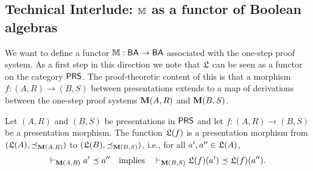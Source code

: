 \documentclass{book}
\begin{document}
\subsection{Technical Interlude: $\mathbb{M}$ as a functor of Boolean algebras}
\label{sec:M-functor}

We want to define a functor $\mathbb{M}: \mathsf{BA} \to \mathsf{BA}$ associated with the
one-step proof system.  As a first step in this direction we note that
$\mathfrak{L}$ can be seen as a functor on the category $\mathsf{PRS}$.  The
proof-theoretic content of this is that a morphism $f:(A,R) \to (B,S)$
between presentations extends to a map of derivations between the
one-step proof systems $\mathbf{M}(A,R)$ and $\mathbf{M}(B,S)$.

\begin{proposition}
\label{prop:liftfun}
Let $(A,R)$ and $(B,S)$ be presentations in $\mathsf{PRS}$ and let $f:(A,R)
\to (B,S)$ be a presentation morphism.  The function $\mathfrak{L}(f)$ is a
presentation morphism from $(\mathfrak{L}(A),\preceq_{\mathbf{M}(A,R)})$ to
$(\mathfrak{L}(B),\preceq_{\mathbf{M}(B,S)})$, i.e., for all $a',a'' \in \mathfrak{L}(A)$,
\begin{equation}\label{equ:hompres}
\vdash_{\mathbf{M}(A,R)} a' \preceq a'' \quad \mbox{implies}  \quad
\vdash_{\mathbf{M}(B,S)} \mathfrak{L}(f)(a') \preceq \mathfrak{L}(f)(a'').
\end{equation}
\end{proposition}
\xxviproofspace
\end{document}
